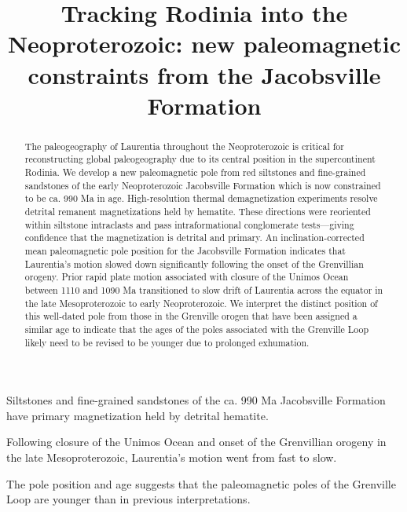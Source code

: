 \documentclass[draft]{agujournal2019}
\begin{document}
\title{Tracking Rodinia into the Neoproterozoic: new paleomagnetic constraints from the Jacobsville Formation}




\begin{keypoints}
\item Siltstones and fine-grained sandstones of the ca. 990 Ma Jacobsville Formation have primary magnetization held by detrital hematite.
\item Following closure of the Unimos Ocean and onset of the Grenvillian orogeny in the late Mesoproterozoic, Laurentia's motion went from fast to slow.
\item The pole position and age suggests that the paleomagnetic poles of the Grenville Loop are younger than in previous interpretations.
\end{keypoints}

\begin{abstract}
The paleogeography of Laurentia throughout the Neoproterozoic is critical for reconstructing global paleogeography due to its central position in the supercontinent Rodinia. We develop a new paleomagnetic pole from red siltstones and fine-grained sandstones of the early Neoproterozoic Jacobsville Formation which is now constrained to be ca. 990 Ma in age. High-resolution thermal demagnetization experiments resolve detrital remanent magnetizations held by hematite. These directions were reoriented within siltstone intraclasts and pass intraformational conglomerate tests---giving confidence that the magnetization is detrital and primary. An inclination-corrected mean paleomagnetic pole position for the Jacobsville Formation indicates that Laurentia's motion slowed down significantly following the onset of the Grenvillian orogeny. Prior rapid plate motion associated with closure of the Unimos Ocean between 1110 and 1090 Ma transitioned to slow drift of Laurentia across the equator in the late Mesoproterozoic to early Neoproterozoic. We interpret the distinct position of this well-dated pole from those in the Grenville orogen that have been assigned a similar age to indicate that the ages of the poles associated with the Grenville Loop likely need to be revised to be younger due to prolonged exhumation. 
\end{abstract}
\end{document}
